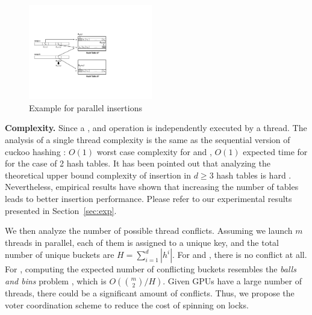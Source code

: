 \begin{figure}[t]
	\centering
	\includegraphics[width=0.48\textwidth]{fig/Voter.pdf}
	\vspace{-1em}
	\caption{Example for parallel insertions}
	\label{fig:voter}
\end{figure}
\vspace{1mm}\noindent\textbf{Complexity.}
Since a ,  and  operation is independently executed by a thread. 
The analysis of a single thread complexity is the same as the sequential version of cuckoo hashing \cite{pagh2004cuckoo}: $O(1)$ worst case complexity for  and , $O(1)$ expected time for  for the case of 2 hash tables. 
It has been pointed out that analyzing the theoretical upper bound complexity of insertion in $d \geq 3$ hash tables is hard \cite{alcantara2009real}.  
Nevertheless, empirical results have shown that increasing the number of tables leads to better insertion performance. Please refer to our experimental results presented in Section~\ref{sec:exp}.

We then analyze the number of possible thread conflicts. Assuming we launch $m$ threads in parallel, each of them is assigned to a unique key, and the total number of unique buckets are $H=\sum_{i=1}^d|h^i|$. For  and , there is no conflict at all. 
For , computing the expected number of conflicting buckets resembles the \emph{balls and bins} problem \cite{raab1998balls}, which is $O(\binom{m}{2}/H)$. 
Given GPUs have a large number of threads, there could be a significant amount of conflicts. Thus, we propose the voter coordination scheme to reduce the cost of spinning on locks. 
